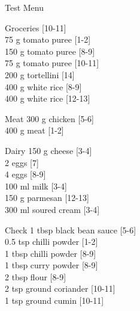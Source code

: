 \begin{menu}{Test Menu}
\begin{shoppinglist}{Groceries}
        {\scriptsize[10-11]}\\
      75 g tomato puree 
        {\scriptsize[1-2]}\\
      150 g tomato puree 
        {\scriptsize[8-9]}\\
      75 g tomato puree 
        {\scriptsize[10-11]}\\
      200 g tortellini 
        {\scriptsize[14]}\\
      400 g white rice 
        {\scriptsize[8-9]}\\
      400 g white rice 
        {\scriptsize[12-13]}\\
      \end{shoppinglist}%
      \par\vfil %
      \begin{shoppinglist}{Meat}
      300 g chicken 
        {\scriptsize[5-6]}\\
      400 g meat 
        {\scriptsize[1-2]}\\
      \end{shoppinglist}%
      \begin{shoppinglist}{Dairy}
      150 g cheese 
        {\scriptsize[3-4]}\\
      2  eggs 
        {\scriptsize[7]}\\
      4  eggs 
        {\scriptsize[8-9]}\\
      100 ml milk 
        {\scriptsize[3-4]}\\
      150 g parmesan 
        {\scriptsize[12-13]}\\
      300 ml soured cream 
        {\scriptsize[3-4]}\\
      \end{shoppinglist}%
      \par\vfil %
      \vfil\clearpage %
      \begin{shoppinglist}{Check}
      1 tbsp black bean sauce 
        {\scriptsize[5-6]}\\
      0.5 tsp chilli powder 
        {\scriptsize[1-2]}\\
      1 tbsp chilli powder 
        {\scriptsize[8-9]}\\
      1 tbsp curry powder 
        {\scriptsize[8-9]}\\
      2 tbsp flour 
        {\scriptsize[8-9]}\\
      2 tsp ground coriander 
        {\scriptsize[10-11]}\\
      1 tsp ground cumin 
        {\scriptsize[10-11]}\\

\end{shoppinglist}
\end{menu}
